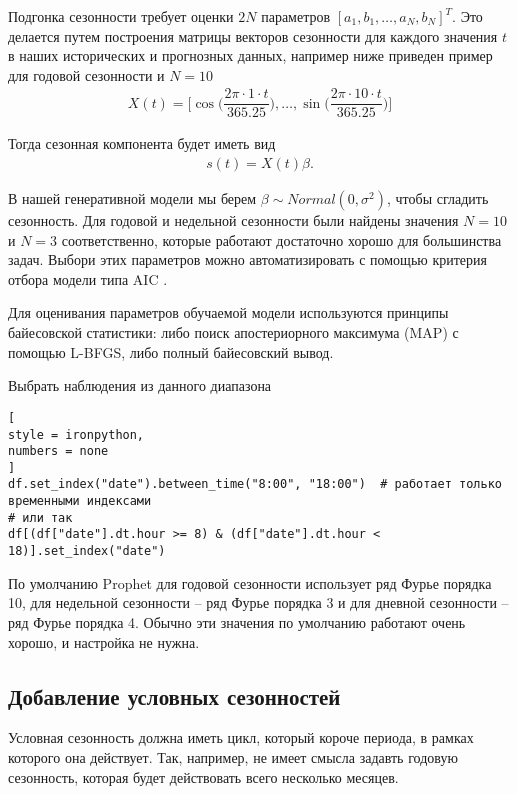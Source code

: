 \documentclass[%
	11pt,
	a4paper,
	utf8,
		]{article}
\begin{document}
Подгонка сезонности требует оценки $2 N$ параметров $[a_1, b_1, \ldots, a_N, b_N]^T$. Это делается путем построения матрицы векторов сезонности для каждого значения $t$ в наших исторических и прогнозных данных, например ниже приведен пример для годовой сезонности и $N = 10$
\begin{align*}
	X(t) = \Bigg[ \cos \Big( \dfrac{2\pi \cdot 1 \cdot t}{365.25} \Big), \ldots, \sin \Big( \dfrac{2\pi \cdot 10 \cdot t}{365.25} \Big) \Bigg]
\end{align*}

Тогда сезонная компонента будет иметь вид
\begin{align*}
s(t) = X(t) \beta.
\end{align*}

В нашей генеративной модели мы берем $\beta \sim Normal(0, \sigma^2)$, чтобы сгладить сезонность. Для годовой и недельной сезонности были найдены значения $N = 10$ и $N = 3$ соответственно, которые работают достаточно хорошо для большинства задач. Выбори этих параметров можно автоматизировать с помощью критерия отбора модели типа AIC \cite[]{gruzdev:time-series-2022}.

Для оценивания параметров обучаемой модели используются принципы байесовской статистики: либо поиск апостериорного максимума (MAP) с помощью L-BFGS, либо полный байесовский вывод. 

Выбрать наблюдения из данного диапазона
\begin{lstlisting}[
style = ironpython,
numbers = none
]
df.set_index("date").between_time("8:00", "18:00")  # работает только временными индексами
# или так
df[(df["date"].dt.hour >= 8) & (df["date"].dt.hour < 18)].set_index("date")
\end{lstlisting}

По умолчанию Prophet для годовой сезонности использует ряд Фурье порядка 10, для недельной сезонности -- ряд Фурье порядка 3 и для дневной сезонности -- ряд Фурье порядка 4. Обычно эти значения по умолчанию работают очень хорошо, и настройка не нужна.

\subsection{Добавление условных сезонностей}

Условная сезонность должна иметь цикл, который короче периода, в рамках которого она действует. Так, например, не имеет смысла задавть годовую сезонность, которая будет действовать всего несколько месяцев. 
\end{document}
